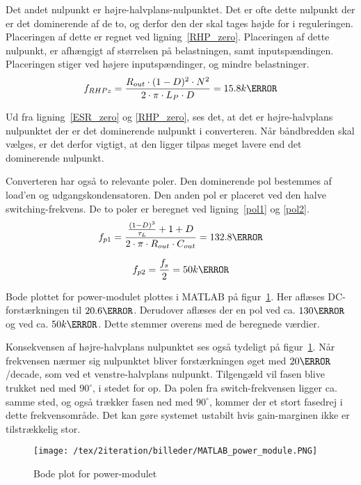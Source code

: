 Det andet nulpunkt er højre-halvplans-nulpunktet. Det er ofte dette nulpunkt der er det dominerende af de to, og derfor den der skal tages højde for i reguleringen. Placeringen af dette er regnet ved ligning~\ref{RHP_zero}. Placeringen af dette nulpunkt, er afhængigt af størrelsen på belastningen, samt inputspændingen. Placeringen stiger ved højere inputspændinger, og mindre belastninger. 
\begin{equation} \label{RHP_zero}
f_{RHPz} = \frac{R_{out} \cdot (1-D)^2 \cdot N^2}{2 \cdot \pi \cdot L_P \cdot D} = 15.8k\hertz
\end{equation}

\noindent Ud fra ligning~\ref{ESR_zero} og \ref{RHP_zero}, ses det, at det er højre-halvplans nulpunktet der er det dominerende nulpunkt i converteren. Når båndbredden skal vælges, er det derfor vigtigt, at den ligger tilpas meget lavere end det dominerende nulpunkt.

Converteren har også to relevante poler. Den dominerende pol bestemmes af load'en og udgangskondensatoren. Den anden pol er placeret ved den halve switching-frekvens. De to poler er beregnet ved ligning~\ref{pol1} og \ref{pol2}.
\begin{equation} \label{pol1}
f_{p1} = \frac{\frac{(1-D)^3}{\tau_L} + 1 + D}{2\cdot \pi \cdot R_{out} \cdot C_{out}} = 132.8\hertz
\end{equation}

\begin{equation} \label{pol2}
f_{p2} = \frac{f_s}{2} = 50k\hertz
\end{equation}

\noindent Bode plottet for power-modulet plottes i MATLAB på figur~\ref{fig:MATLAB_power_module}. Her aflæses DC-forstærkningen til $20.6\decibel$. Derudover aflæses der en pol ved ca. $130\hertz$ og ved ca. $50k\hertz$. Dette stemmer overens med de beregnede værdier.

Konsekvensen af højre-halvplans nulpunktet ses også tydeligt på figur~\ref{fig:MATLAB_power_module}. Når frekvensen nærmer sig nulpunktet bliver forstærkningen øget med $20 \decibel$/decade, som ved et venstre-halvplans nulpunkt. Tilgengæld vil fasen blive trukket ned med $90^\circ$, i stedet for op. Da polen fra switch-frekvensen ligger ca. samme sted, og også trækker fasen ned med $90^\circ$, kommer der et stort fasedrej i dette frekvensområde. Det kan gøre systemet ustabilt hvis gain-marginen ikke er tilstrækkelig stor. 

\begin{figure}[H]
	\center
	\texttt{[image: /tex/2iteration/billeder/MATLAB\_power\_module.PNG]}
	\caption{Bode plot for power-modulet}
	\label{fig:MATLAB_power_module}
\end{figure}

